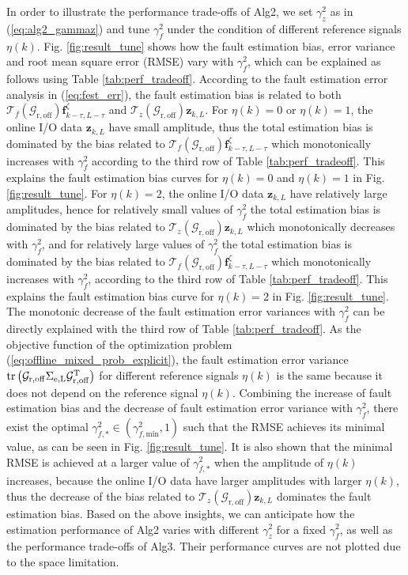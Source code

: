 \documentclass[twocolumn]{autart}
\begin{document}
In order to illustrate the performance trade-offs of Alg2, we set $\gamma_z^2$ as in (\ref{eq:alg2_gammaz}) and tune $\gamma_f^2$ under the condition of different reference signals $\eta(k)$. Fig. \ref{fig:result_tune} shows how the fault estimation bias, error variance and root mean square error (RMSE) vary with $\gamma_f^2$, which can be explained as follows using Table \ref{tab:perf_tradeoff}.
According to the fault estimation error analysis in (\ref{eq:fest_err}), the fault estimation bias is related to both $\mathcal{T}_f \left( \mathcal{G}_{\mathrm{r,off}} \right) \mathbf{f}_{k-\tau,L-\tau}^\zeta$
and $\mathcal{T}_z \left( \mathcal{G}_{\mathrm{r,off}} \right) \mathbf{z}_{k,L}$.
For $\eta(k)=0$ or $\eta(k)=1$, the online I/O data $\mathbf{z}_{k,L}$ have small amplitude, thus the total estimation bias is dominated by the bias related to  $\mathcal{T}_f \left( \mathcal{G}_{\mathrm{r,off}} \right) \mathbf{f}_{k-\tau,L-\tau}^\zeta$ which monotonically increases with $\gamma_f^2$ according to the third row of Table \ref{tab:perf_tradeoff}. This explains the fault estimation bias curves for $\eta(k)=0$ and $\eta(k)=1$ in Fig. \ref{fig:result_tune}.
For $\eta(k)=2$, the online I/O data $\mathbf{z}_{k,L}$ have relatively large amplitudes, hence for relatively small values of $\gamma_f^2$ the total estimation bias is dominated by the bias related to $\mathcal{T}_z \left( \mathcal{G}_{\mathrm{r,off}} \right) \mathbf{z}_{k,L}$ which monotonically decreases with $\gamma_f^2$, and for relatively large values of $\gamma_f^2$ the total estimation bias is dominated by the bias related to $\mathcal{T}_f \left( \mathcal{G}_{\mathrm{r,off}} \right) \mathbf{f}_{k-\tau,L-\tau}^\zeta$ which monotonically increases with $\gamma_f^2$, according to the third row of Table \ref{tab:perf_tradeoff}. This explains the fault estimation bias curve for $\eta(k)=2$ in Fig. \ref{fig:result_tune}. The monotonic decrease of the fault estimation error variances with $\gamma_f^2$ can be directly explained with the third row of Table \ref{tab:perf_tradeoff}.
As the objective function of the optimization problem (\ref{eq:offline_mixed_prob_explicit}), the fault estimation error variance $\rm{tr} \left( \mathcal{G}_{\rm{r,off}} \Sigma_{e,L} \mathcal{G}_{\rm{r,off}}^\mathrm{T} \right)$ for different reference signals $\eta(k)$ is the same because it does not depend on the reference signal $\eta(k)$. Combining the increase of fault estimation bias and the decrease of fault estimation error variance with $\gamma_f^2$, there exist the optimal $\gamma_{f,*}^2 \in \left( \gamma_{f,\text{min}}^2, 1 \right)$ such that the RMSE achieves its minimal value, as can be seen in Fig. \ref{fig:result_tune}. It is also shown that the minimal RMSE is achieved at a larger value of $\gamma_{f,*}^2$ when the amplitude of $\eta(k)$ increases, because the online I/O data have larger amplitudes with larger $\eta(k)$, thus the decrease of the bias related to $\mathcal{T}_z \left( \mathcal{G}_{\mathrm{r,off}} \right) \mathbf{z}_{k,L}$ dominates the fault estimation bias. Based on the above insights, we can anticipate how the estimation performance of Alg2 varies with different $\gamma_z^2$ for a fixed $\gamma_f^2$, as well as the performance trade-offs of Alg3. Their performance curves are not plotted due to the space limitation.
\end{document}
